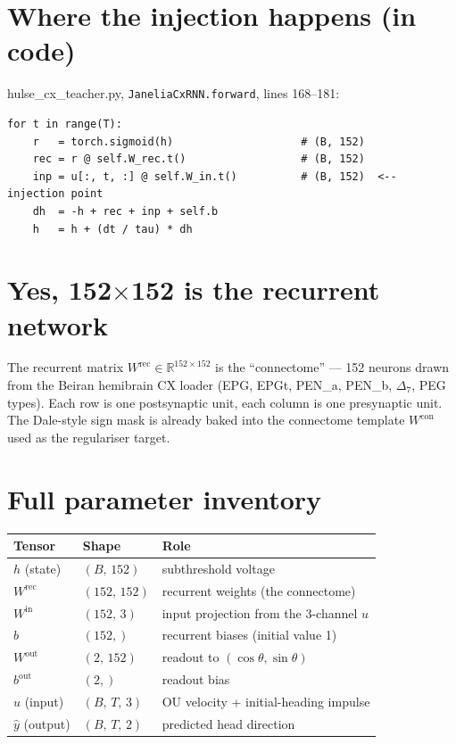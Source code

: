\documentclass[11pt]{article}
\begin{document}
\section*{Where the injection happens (in code)}

\begin{center}\small\ttfamily
hulse\_cx\_teacher.py, \texttt{JaneliaCxRNN.forward}, lines 168--181:
\end{center}
\vspace{-0.3em}
{\small
\begin{verbatim}
for t in range(T):
    r   = torch.sigmoid(h)                    # (B, 152)
    rec = r @ self.W_rec.t()                  # (B, 152)
    inp = u[:, t, :] @ self.W_in.t()          # (B, 152)  <-- injection point
    dh  = -h + rec + inp + self.b
    h   = h + (dt / tau) * dh
\end{verbatim}
}

\section*{Yes, 152$\times$152 is the recurrent network}

The recurrent matrix $W^{\mathrm{rec}}\in\mathbb{R}^{152\times 152}$ is the
``connectome'' --- 152 neurons drawn from the Beiran hemibrain CX loader
(EPG, EPGt, PEN\_a, PEN\_b, $\Delta_7$, PEG types). Each row is one
postsynaptic unit, each column is one presynaptic unit. The Dale-style
sign mask is already baked into the connectome template
$W^{\mathrm{con}}$ used as the regulariser target.

\section*{Full parameter inventory}

\begin{center}\small
\begin{tabular}{lll}
\toprule
\textbf{Tensor} & \textbf{Shape} & \textbf{Role} \\
\midrule
$h$ (state)       & $(B,\,152)$        & subthreshold voltage \\
$W^{\mathrm{rec}}$ & $(152,\,152)$     & recurrent weights (the connectome) \\
$W^{\mathrm{in}}$  & $(152,\,3)$       & input projection from the 3-channel $u$ \\
$b$               & $(152,)$           & recurrent biases (initial value 1) \\
$W^{\mathrm{out}}$ & $(2,\,152)$       & readout to $(\cos\theta,\sin\theta)$ \\
$b^{\mathrm{out}}$ & $(2,)$             & readout bias \\
$u$ (input)       & $(B,\,T,\,3)$      & OU velocity + initial-heading impulse \\
$\hat y$ (output) & $(B,\,T,\,2)$      & predicted head direction \\
\bottomrule
\end{tabular}
\end{center}
\end{document}
